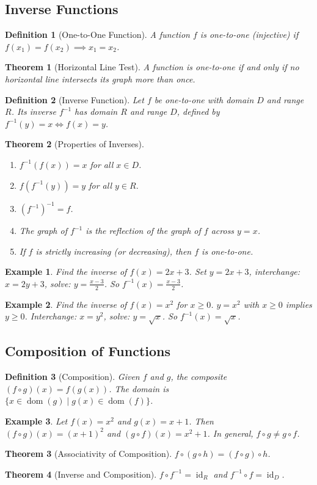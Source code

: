 \documentclass[11pt,a4paper]{article}
\newtheorem{example}{Example}
\newtheorem{theorem}{Theorem}
\newtheorem{definition}{Definition}
\begin{document}
\subsection{Inverse Functions}
\begin{definition}[One-to-One Function]
A function $f$ is \textit{one-to-one} (injective) if $f(x_1) = f(x_2) \implies x_1 = x_2$.
\end{definition}
\begin{theorem}[Horizontal Line Test]
A function is one-to-one if and only if no horizontal line intersects its graph more than once.
\end{theorem}
\begin{definition}[Inverse Function]
Let $f$ be one-to-one with domain $D$ and range $R$. Its \textit{inverse} $f^{-1}$ has domain $R$ and range $D$, defined by $f^{-1}(y) = x \iff f(x) = y$.
\end{definition}
\begin{theorem}[Properties of Inverses]
\begin{enumerate}
\item $f^{-1}(f(x)) = x$ for all $x \in D$.
\item $f(f^{-1}(y)) = y$ for all $y \in R$.
\item $(f^{-1})^{-1} = f$.
\item The graph of $f^{-1}$ is the reflection of the graph of $f$ across $y = x$.
\item If $f$ is strictly increasing (or decreasing), then $f$ is one-to-one.
\end{enumerate}
\end{theorem}
\begin{example}
Find the inverse of $f(x) = 2x + 3$.
Set $y = 2x + 3$, interchange: $x = 2y + 3$, solve: $y = \frac{x-3}{2}$. So $f^{-1}(x) = \frac{x-3}{2}$.
\end{example}
\begin{example}
Find the inverse of $f(x) = x^2$ for $x \geq 0$.
$y = x^2$ with $x \geq 0$ implies $y \geq 0$. Interchange: $x = y^2$, solve: $y = \sqrt{x}$. So $f^{-1}(x) = \sqrt{x}$.
\end{example}
\subsection{Composition of Functions}
\begin{definition}[Composition]
Given $f$ and $g$, the \textit{composite} $(f \circ g)(x) = f(g(x))$. The domain is $\{x \in \operatorname{dom}(g) \mid g(x) \in \operatorname{dom}(f)\}$.
\end{definition}
\begin{example}
Let $f(x) = x^2$ and $g(x) = x + 1$. Then $(f \circ g)(x) = (x+1)^2$ and $(g \circ f)(x) = x^2 + 1$. In general, $f \circ g \neq g \circ f$.
\end{example}
\begin{theorem}[Associativity of Composition]
$f \circ (g \circ h) = (f \circ g) \circ h$.
\end{theorem}
\begin{theorem}[Inverse and Composition]
$f \circ f^{-1} = \operatorname{id}_R$ and $f^{-1} \circ f = \operatorname{id}_D$.
\end{theorem}
\end{document}
